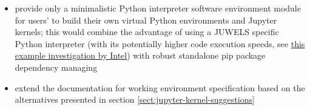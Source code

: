 \documentclass[11pt,a4paper]{article}
\begin{document}
\begin{itemize}
  \item provide only a minimalistic Python interpreter software environment module for users' to build their own virtual Python environments and Jupyter kernels;
  this would combine the advantage of using a JUWELS specific Python interpreter (with its potentially higher code execution speeds, see \href{https://www.fz-juelich.de/SharedDocs/Downloads/IAS/JSC/EN/slides/supercomputer-ressources-2019-11/15a-tuning_intel.html}{this example investigation by Intel}) with robust standalone pip package dependency managing

  \item extend the documentation for working environment specification based on the alternatives presented in section \ref{sect:jupyter-kernel-suggestions}

\end{itemize}







\end{document}
